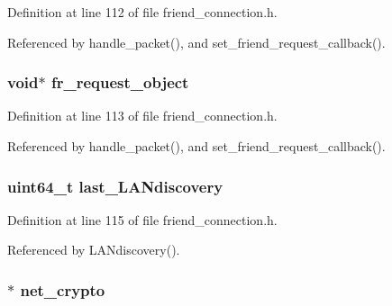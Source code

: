 Definition at line 112 of file friend\+\_\+connection.\+h.



Referenced by handle\+\_\+packet(), and set\+\_\+friend\+\_\+request\+\_\+callback().

\hypertarget{struct_friend___connections_abd31f2a386ec582b378de4fc3f05ea6c}{
\subsubsection[{fr\+\_\+request\+\_\+object}]{\setlength{\rightskip}{0pt plus 5cm}void$\ast$ fr\+\_\+request\+\_\+object}}\label{struct_friend___connections_abd31f2a386ec582b378de4fc3f05ea6c}


Definition at line 113 of file friend\+\_\+connection.\+h.



Referenced by handle\+\_\+packet(), and set\+\_\+friend\+\_\+request\+\_\+callback().

\hypertarget{struct_friend___connections_a4f77ba6531c78b4f6a2a46843d06cc26}{
\subsubsection[{last\+\_\+\+L\+A\+Ndiscovery}]{\setlength{\rightskip}{0pt plus 5cm}uint64\+\_\+t last\+\_\+\+L\+A\+Ndiscovery}}\label{struct_friend___connections_a4f77ba6531c78b4f6a2a46843d06cc26}


Definition at line 115 of file friend\+\_\+connection.\+h.



Referenced by L\+A\+Ndiscovery().

\hypertarget{struct_friend___connections_ab06a41217a1e9b5985555e19e088ae94}{
\subsubsection[{net\+\_\+crypto}]{$\ast$ net\+\_\+crypto}}\label{struct_friend___connections_ab06a41217a1e9b5985555e19e088ae94}


